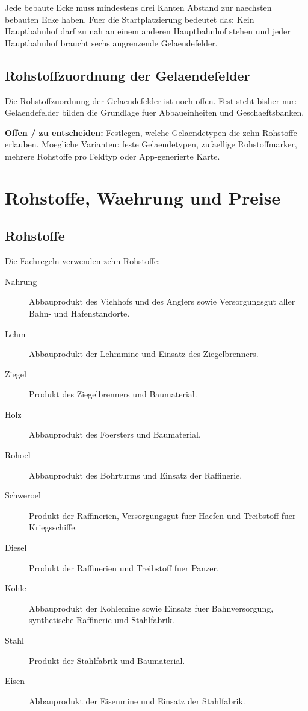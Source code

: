 \documentclass[11pt,a4paper,oneside,parskip=half]{scrreprt}
\newcommand{\offen}[1]{\begin{framed}\noindent\textbf{Offen / zu entscheiden:} #1\end{framed}}
\begin{document}
Jede bebaute Ecke muss mindestens drei Kanten Abstand zur naechsten bebauten Ecke
haben. Fuer die Startplatzierung bedeutet das: Kein Hauptbahnhof darf zu nah an
einem anderen Hauptbahnhof stehen und jeder Hauptbahnhof braucht sechs
angrenzende Gelaendefelder.

\section{Rohstoffzuordnung der Gelaendefelder}
Die Rohstoffzuordnung der Gelaendefelder ist noch offen. Fest steht bisher nur: Gelaendefelder bilden die Grundlage fuer Abbaueinheiten und Geschaeftsbanken.

\offen{Festlegen, welche Gelaendetypen die zehn Rohstoffe erlauben. Moegliche Varianten: feste Gelaendetypen, zufaellige Rohstoffmarker, mehrere Rohstoffe pro Feldtyp oder App-generierte Karte.}

\chapter{Rohstoffe, Waehrung und Preise}

\section{Rohstoffe}
Die Fachregeln verwenden zehn Rohstoffe:
\begin{description}
  \item[Nahrung] Abbauprodukt des Viehhofs und des Anglers sowie Versorgungsgut aller Bahn- und Hafenstandorte.
  \item[Lehm] Abbauprodukt der Lehmmine und Einsatz des Ziegelbrenners.
  \item[Ziegel] Produkt des Ziegelbrenners und Baumaterial.
  \item[Holz] Abbauprodukt des Foersters und Baumaterial.
  \item[Rohoel] Abbauprodukt des Bohrturms und Einsatz der Raffinerie.
  \item[Schweroel] Produkt der Raffinerien, Versorgungsgut fuer Haefen und Treibstoff fuer Kriegsschiffe.
  \item[Diesel] Produkt der Raffinerien und Treibstoff fuer Panzer.
  \item[Kohle] Abbauprodukt der Kohlemine sowie Einsatz fuer Bahnversorgung, synthetische Raffinerie und Stahlfabrik.
  \item[Stahl] Produkt der Stahlfabrik und Baumaterial.
  \item[Eisen] Abbauprodukt der Eisenmine und Einsatz der Stahlfabrik.
\end{description}
\end{document}
